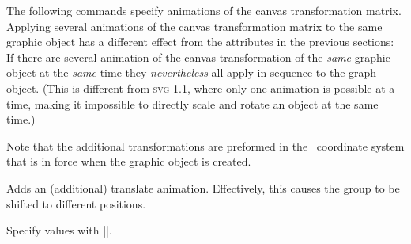 The following commands specify animations of the canvas transformation
matrix. Applying several animations of the canvas transformation
matrix to the same graphic object has a different effect from the
attributes in the previous sections: If there are several animation of
the canvas transformation of the \emph{same} graphic object at the
\emph{same} time they \emph{nevertheless} all apply in sequence to the
graph object. (This is different from \textsc{svg 1.1}, where only one
animation is possible at a time, making it impossible to directly
scale and rotate an object at the same time.)

Note that the additional transformations are preformed in the
\pgfname\ coordinate system that is in force when the graphic object
is created. 

\begin{codeexample}[]
\end{codeexample}


\begin{command}{\pgfsys@animatetranslate}
  Adds an (additional) translate animation. Effectively, this causes
  the group to be shifted to different positions.
  
  Specify values with |\pgfsys@animation@translate|. 
\begin{codeexample}[width=2cm]
\end{codeexample}
\end{command}


